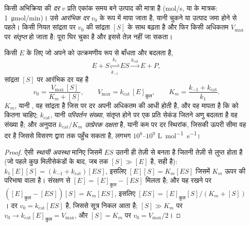 \begin{definition}[आरंभिक दर, संतृप्ति]\label{def:b1:enzymes:rate}
किसी  अभिक्रिया की \emph{दर} $v$ प्रति एकांक
समय बने उत्पाद की मात्रा है (\unit{mol/s}, या  के मात्रक:
\qty{1}{\micro mol/min})। उसे \emph{आरंभिक
दर} $v_0$ के रूप में मापा जाता है, यानी  चुकने या उत्पाद जमा
होने से पहले। किसी नियत  सांद्रता पर $v_0$  की सांद्रता
$[S]$ के साथ बढ़ता है और फिर किसी अधिकतम $V_{\max}$ पर
\emph{संतृप्त} हो जाता है:  पूरा घिर चुका है और इससे तेज़ नहीं जा
सकता।
\end{definition}

\begin{theorem}[माइकेलिस--मेंटन]\label{thm:b1:enzymes:mm}
किसी  $E$ के लिए जो अपने  को उत्क्रमणीय रूप से बाँधता और बदलता है,
\[
E + S \underset{k_{-1}}{\overset{k_1}{\rightleftharpoons}} ES
\overset{k_{\mathrm{cat}}}{\longrightarrow} E + P ,
\]
 सांद्रता $[S]$ पर आरंभिक दर यह है
\[
v_0 = \frac{V_{\max}\,[S]}{K_m + [S]}, \qquad V_{\max} = k_{\mathrm{cat}}\,[E]_{\text{कुल}},
\qquad K_m = \frac{k_{-1} + k_{\mathrm{cat}}}{k_1} .
\]
$K_m$, यानी \emph{}, वह  सांद्रता है
जिस पर दर अपनी अधिकतम की आधी होती है, और वह मापता है कि  को कितना
 चाहिए; $k_{\mathrm{cat}}$, यानी \emph{परिवर्तन
संख्या}, संतृप्त होने पर एक  प्रति सेकंड
जितने  अणु बदलता है वह संख्या है; और अनुपात
$k_{\mathrm{cat}}/K_m$ \emph{उत्प्रेरक दक्षता} है, यानी कम  पर दर
स्थिरांक, जिसकी ऊपरी सीमा वह दर है जिससे  विसरण द्वारा 
तक पहुँच सकता है, लगभग
$10^8$--$10^9$ \unit{L.mol^{-1}.s^{-1}}।
\end{theorem}
\begin{proof}
ऐसी \emph{स्थायी अवस्था} मानिए जिसमें $ES$ उतनी ही तेज़ी से बनता है
जितनी तेज़ी से लुप्त होता है (जो पहले कुछ मिलीसेकंडों के बाद, जब तक
$[S] \gg [E]$ है, सही है):
$k_1[E][S] = (k_{-1} + k_{\mathrm{cat}})[ES]$, इसलिए $[E][S] = K_m[ES]$
जिसमें $K_m$ ऊपर की परिभाषा वाला है। संरक्षण से $[E] = [E]_{\text{कुल}} -
[ES]$ मिलता है; और यह रखने पर $([E]_{\text{कुल}} - [ES])[S] = K_m[ES]$,
इसलिए $[ES] = [E]_{\text{कुल}}[S]/(K_m + [S])$। दर
$v_0 = k_{\mathrm{cat}}[ES]$ है, जिससे सूत्र निकल आता है; $[S] \gg K_m$ पर
$v_0 \to k_{\mathrm{cat}}[E]_{\text{कुल}} = V_{\max}$, और $[S] = K_m$ पर
$v_0 = V_{\max}/2$।
\end{proof}

